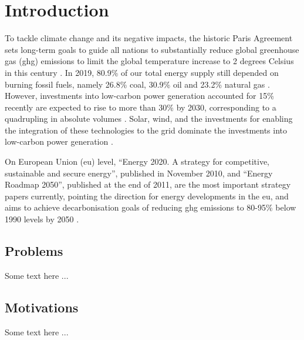 \chapter{Introduction} 

To tackle climate change and its negative impacts, 
the historic Paris Agreement 
sets long-term goals to guide all nations 
to substantially reduce global greenhouse gas (\gls{ghg}) emissions 
to limit the global temperature increase
to 2 degrees Celsius in this century \cite{paris}. 
In 2019, 
80.9\% of our total energy supply still depended on burning fossil fuels, 
namely 
26.8\% coal, 30.9\% oil and 23.2\% natural gas \cite{iea}. 
However, 
investments into low-carbon power generation 
accounted for 15\% recently 
are expected to rise to more than 30\% by 2030, 
corresponding to a quadrupling in absolute volumes \cite{shift}. 
Solar, wind, and the investments 
for enabling the integration of these technologies to the grid 
dominate the investments into low-carbon power generation \cite{shift}. 

On European Union (\gls{eu}) level, 
“Energy 2020. A strategy for competitive, sustainable and secure energy”, 
published in November 2010,
and 
“Energy Roadmap 2050”, 
published at the end of 2011,
are the most important strategy papers currently,  
pointing the direction for energy developments in the \gls{eu},  
and aims to achieve decarbonisation goals 
of reducing \gls{ghg} emissions to 80-95\% below 1990 levels
by 2050 \cite{roadmap}.

\section{Problems}

Some text here ...

\section{Motivations}

Some text here ...

